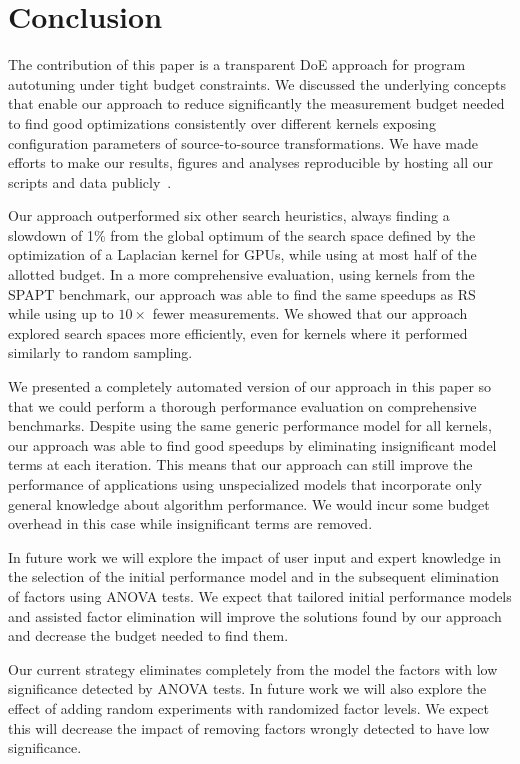\documentclass[conference]{IEEEtran}
\begin{document}
\section{Conclusion}
\label{sec:orga2e34a4}
The contribution of this paper is a transparent DoE approach for program
autotuning under tight budget constraints. We discussed the underlying concepts
that enable our approach to reduce significantly the measurement budget needed
to find good optimizations consistently over different kernels exposing
configuration parameters of source-to-source transformations. We have made
efforts to make our results, figures and analyses reproducible by hosting all
our scripts and data publicly~\cite{bruel2018ccgrid19}.

Our approach outperformed six other search heuristics, always finding a slowdown
of 1\% from the global optimum of the search space defined by the optimization of
a Laplacian kernel for GPUs, while using at most half of the allotted budget. In
a more comprehensive evaluation, using kernels from the SPAPT benchmark, our
approach was able to find the same speedups as RS while using up to \(10\times\)
fewer measurements. We showed that our approach explored search spaces more
efficiently, even for kernels where it performed similarly to random sampling.

We presented a completely automated version of our approach in this paper so
that we could perform a thorough performance evaluation on comprehensive
benchmarks. Despite using the same generic performance model for all kernels,
our approach was able to find good speedups by eliminating insignificant model
terms at each iteration. This means that our approach can still improve the
performance of applications using unspecialized models that incorporate only
general knowledge about algorithm performance. We would incur some budget
overhead in this case while insignificant terms are removed.

In future work we will explore the impact of user input and expert knowledge in
the selection of the initial performance model and in the subsequent elimination
of factors using ANOVA tests. We expect that tailored initial performance models
and assisted factor elimination will improve the solutions found by our approach
and decrease the budget needed to find them.

Our current strategy eliminates completely from the model the factors with low
significance detected by ANOVA tests. In future work we will also explore the
effect of adding random experiments with randomized factor levels. We expect
this will decrease the impact of removing factors wrongly detected to have low
significance.
\end{document}
